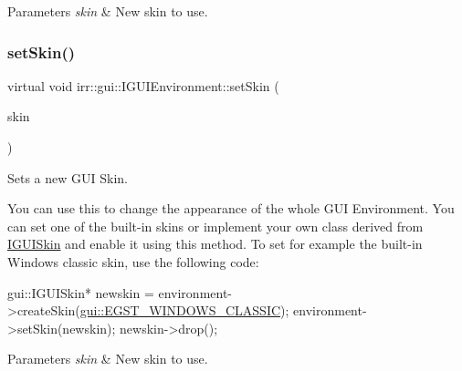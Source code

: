 \begin{DoxyParams}{Parameters}
{\em skin} & New skin to use. \\
\hline
\end{DoxyParams}
\mbox{\label{classirr_1_1gui_1_1IGUIEnvironment_ae7042c520e848643e080ad4532797f23}} 
\subsubsection{\texorpdfstring{set\+Skin()}{setSkin()}\hspace{0.1cm}{\footnotesize\ttfamily [2/2]}}
{\footnotesize\ttfamily virtual void irr\+::gui\+::\+I\+G\+U\+I\+Environment\+::set\+Skin (\begin{DoxyParamCaption}\item[{\hyperlink{classirr_1_1gui_1_1IGUISkin}{I\+G\+U\+I\+Skin} $\ast$}]{skin }\end{DoxyParamCaption})\hspace{0.3cm}{\ttfamily [pure virtual]}}



Sets a new G\+UI Skin. 

You can use this to change the appearance of the whole G\+UI Environment. You can set one of the built-\/in skins or implement your own class derived from \hyperlink{classirr_1_1gui_1_1IGUISkin}{I\+G\+U\+I\+Skin} and enable it using this method. To set for example the built-\/in Windows classic skin, use the following code\+: 
\begin{DoxyCode}
gui::IGUISkin* newskin = environment->createSkin(\hyperlink{namespaceirr_1_1gui_a7b4619db540cbdf96e81023893b4eca5a19cf56de39bd4775be379ac8198cb280}{gui::EGST\_WINDOWS\_CLASSIC});
environment->setSkin(newskin);
newskin->drop();
\end{DoxyCode}
 
\begin{DoxyParams}{Parameters}
{\em skin} & New skin to use. \\
\hline
\end{DoxyParams}
\mbox{\label{classirr_1_1gui_1_1IGUIEnvironment_a2491715aa30894c66357eb0451aa10b0}} 
